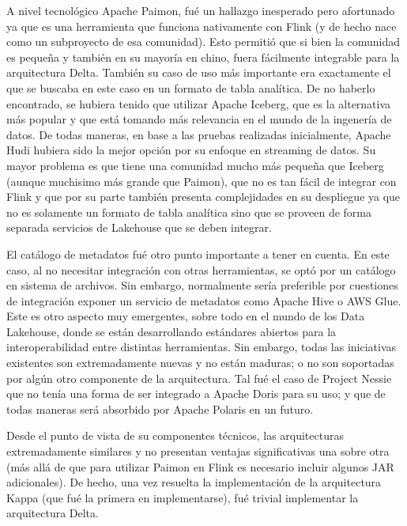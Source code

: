A nivel tecnológico Apache Paimon, fué un hallazgo inesperado pero afortunado ya que es una herramienta que funciona nativamente con Flink (y de hecho nace como un subproyecto de esa comunidad).
Esto permitió que si bien la comunidad es pequeña y también en su mayoría en chino, fuera fácilmente integrable para la arquitectura Delta. 
También su caso de uso más importante era exactamente el que se buscaba en este caso en un formato de tabla analítica. 
De no haberlo encontrado, se hubiera tenido que utilizar Apache Iceberg, que es la alternativa más popular y que está tomando más relevancia en el mundo de la ingenería de datos. 
De todas maneras, en base a las pruebas realizadas inicialmente, Apache Hudi hubiera sido la mejor opción por su enfoque en streaming de datos. 
Su mayor problema es que tiene una comunidad mucho más pequeña que Iceberg (aunque muchisimo más grande que Paimon), que no es tan fácil de integrar con Flink 
y que por su parte también presenta complejidades en su despliegue ya que no es solamente un formato de tabla analítica sino que se proveen de forma separada servicios de Lakehouse que se deben integrar. 

El catálogo de metadatos fué otro punto importante a tener en cuenta. En este caso, al no necesitar integración con otras herramientas,
se optó por un catálogo en sistema de archivos. Sin embargo, normalmente sería preferible por cuestiones de integración exponer un servicio de metadatos como Apache Hive o AWS Glue.
Este es otro aspecto muy emergentes, sobre todo en el mundo de los Data Lakehouse, donde se están desarrollando estándares abiertos para la interoperabilidad entre distintas herramientas.
Sin embargo, todas las iniciativas existentes son extremadamente nuevas y no están maduras; o no son soportadas por algún otro componente de la arquitectura. 
Tal fué el caso de Project Nessie que no tenía una forma de ser integrado a Apache Doris para su uso; y que de todas maneras será absorbido por Apache Polaris en un futuro.

Desde el punto de vista de su componentes técnicos, las arquitecturas extremadamente similares y no presentan ventajas significativas una sobre otra 
(más allá de que para utilizar Paimon en Flink es necesario incluir algunos JAR adicionales).
De hecho, una vez resuelta la implementación de la arquitectura Kappa (que fué la primera en implementarse), fué trivial implementar la arquitectura Delta. 

\newpage
